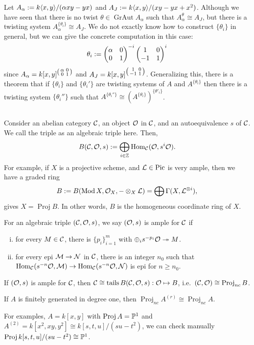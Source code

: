 \documentclass{../../../small}
\newcommand{\GrAut}{\operatorname{GrAut}}
\newcommand{\Proj}{\operatorname{Proj}}
\newcommand{\tails}{\operatorname{tails}}
\newcommand{\Pic}{\operatorname{Pic}}
\begin{document}
Let $A_\alpha:=k\<x,y\>/(\alpha xy-yx)$ and $A_J:=k\<x,y\>/(xy-yx+x^2)$.
Although we have seen that there is no twist $\theta\in\GrAut A_\alpha$ such that $A_\alpha^\theta\cong A_J$, but there is a twisting system $A_\alpha^{\{\theta_i\}}\cong A_J$.
We do not exactly know how to construct $\{\theta_i\}$ in general, but we can give the concrete computation in this case:
\[\theta_i:=\mat{\alpha&0\\0&1}^{-i}\mat{1&0\\-1&1}^i\]
since $A_\alpha=k[x,y]^{\left(\mat[small]{\alpha&0\\0&1}\right)}$ and $A_J=k[x,y]^{\left(\mat[small]{1&0\\-1&1}\right)}$.
Generalizing this, there is a theorem that if $\{\theta_i\}$ and $\{\theta_i'\}$ are twisting systems of $A$ and $A^{\{\theta_i\}}$ then there is a twisting system $\{\theta_i''\}$ such that $A^{\{\theta_i''\}}\cong(A^{\{\theta_i\}})^{\{\theta'_i\}}$.


\subsection{}

Consider an abelian category $\cC$, an object $\cO$ in $\cC$, and an autoequivalence $s$ of $\cC$.
We call the triple as an algebraic triple here.
Then,
\[B(\cC,\cO,s):=\bigoplus_{i\in\Z}\Hom_\cC(\cO,s^i\cO).\]
For example, if $X$ is a projective scheme, and $\cL\in\Pic$ is very ample, then we have a graded ring
\[B:=B(\Mod X,\cO_X,-\otimes_X\cL)=\bigoplus\Gamma(X,\cL^{\otimes i}),\]
gives $X=\Proj B$.
In other words, $B$ is the homogeneous coordinate ring of $X$.
\begin{defn}
For an algebraic triple $(\cC,\cO,s)$, we say $(\cO,s)$ is ample for $\cC$ if
\begin{enumerate}[(i)]
\item for every $M\in\cC$, there is $\{p_i\}_{i=1}^m$ with $\oplus_is^{-p_i}\cO\twoheadrightarrow M$.
\item for every epi $\cM\to\cN$ in $\cC$, there is an integer $n_0$ such that $\Hom_\cC(s^{-n}\cO,\cM)\to\Hom_\cC(s^{-n}\cO,\cN)$ is epi for $n\ge n_0$.
\end{enumerate}
\end{defn}


\begin{thm}
If $(\cO,s)$ is ample for $\cC$, then $\cC\cong\tails B(\cC,\cO,s):\cO\mapsto B$, i.e.~$(\cC,\cO)\cong\Proj_{nc}B$.
\end{thm}
\begin{cor}
If $A$ is finitely generated in degree one, then $\Proj_{nc} A^{(r)}\cong \Proj_{nc}A$.
\end{cor}
For examples, $A=k[x,y]$ with $\Proj A=\P^1$ and $A^{(2)}=k[x^2,xy,y^2]\cong k[s,t,u]/(su-t^2)$, we can check manually $\Proj k[s,t,u]/(su-t^2)\cong\P^1$.
\end{document}
